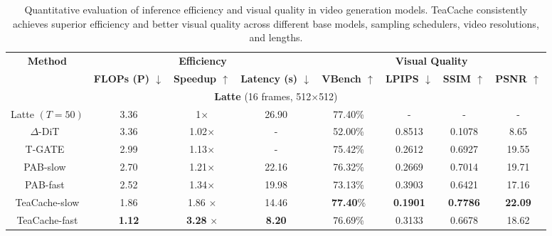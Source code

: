 \begin{table}[]
    \centering
    \caption{Quantitative evaluation of inference efficiency and visual quality in video generation models. TeaCache consistently achieves superior efficiency and better visual quality across different base models, sampling schedulers, video resolutions, and lengths.
    }
    \label{tab: main}
    \begin{tabular}{c|ccc|cccc}
        \toprule
        \multirow{2}{*}{\textbf{Method}} & \multicolumn{3}{c|}{\textbf{Efficiency}} & \multicolumn{4}{c}{\textbf{Visual Quality}} \\ \cline{2-8}
         & \textbf{FLOPs (P) $\downarrow$} & \textbf{Speedup $\uparrow$} & \textbf{Latency (s) $\downarrow$} & \textbf{VBench $\uparrow$} & \textbf{LPIPS $\downarrow$} & \textbf{SSIM $\uparrow$} & \textbf{PSNR $\uparrow$} \\

         \hline
        \hline
        \multicolumn{8}{c}{\textbf{Latte} (16 frames, 512$\times$512)} \\
        \hline
        \rowcolor[gray]{0.9} Latte $(T = 50)$ & 3.36 & 1$\times$ & 26.90 & 77.40\% & - & - & - \\
        $\Delta$-DiT~\cite{chen2024delta} & 3.36 & 1.02$\times$ & - & 52.00\% & 0.8513 & 0.1078 & 8.65 \\
        T-GATE~\cite{zhang2024cross} & 2.99 & 1.13$\times$ & - & 75.42\% & 0.2612 & 0.6927 & 19.55 \\
        PAB-slow~\cite{zhao2024real} & 2.70 & 1.21$\times$ & 22.16  &76.32\% & 0.2669 & 0.7014 &  19.71 \\
        PAB-fast~\cite{zhao2024real} & 2.52 & 1.34$\times$ & 19.98 & 73.13\% & 0.3903 & 0.6421 &  17.16 \\
        \hline
        TeaCache-slow & 1.86  &1.86 $\times$ & 14.46 & \textbf{77.40}\% & \textbf{0.1901} & \textbf{0.7786} &\textbf{22.09}  \\
        TeaCache-fast & \textbf{1.12}  &\textbf{3.28} $\times$ & \textbf{8.20} & 76.69\% & 0.3133 & 0.6678 &18.62  \\



\end{tabular}
\end{table}
